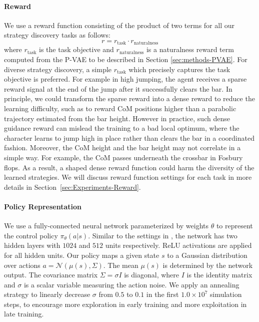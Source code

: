 \paragraph{Reward}
We use a reward function consisting of the product of two terms for all our strategy discovery tasks as follows:
\begin{equation}
\label{eq:stage1-reward}
    r = r_{\text{task}} \cdot r_{\text{naturalness}} 
\end{equation}    
where $r_{\text{task}}$ is the task objective and $r_{\text{naturalness}}$ is a naturalness reward term computed from the P-VAE to be described in Section \ref{sec:methods-PVAE}. For diverse strategy discovery, a simple $r_{\text{task}}$ which precisely captures the task objective is preferred. For example in high jumping, the agent receives a sparse reward signal at the end of the jump after it successfully clears the bar. In principle, we could transform the sparse reward into a dense reward to reduce the learning difficulty, such as to reward CoM positions higher than a parabolic trajectory estimated from the bar height. However in practice, such dense guidance reward can mislead the training to a bad local optimum, where the character learns to jump high in place rather than clears the bar in a coordinated fashion. Moreover, the CoM height and the bar height may not correlate in a simple way. For example, the CoM passes underneath the crossbar in Fosbury flops. As a result, a shaped dense reward function could harm the diversity of the learned strategies. We will discuss reward function settings for each task in more details in Section~\ref{sec:Experiments-Reward}.

\paragraph{Policy Representation}
We use a fully-connected neural network parameterized by weights $\theta$ to represent the control policy $\pi_\theta(a|s)$. Similar to the settings in \cite{Peng:2018:DeepMimic}, the network has two hidden layers with $1024$ and $512$ units respectively. ReLU activations are applied for all hidden units. Our policy maps a given state $s$ to a Gaussian distribution over actions $a=\mathcal{N}(\mu(s), \Sigma)$. The mean $\mu(s)$ is determined by the network output. The covariance matrix $\Sigma=\sigma I$ is diagonal, where $I$ is the identity matrix and $\sigma$ is a scalar variable measuring the action noise. We apply an annealing strategy to linearly decrease $\sigma$ from $0.5$ to $0.1$ in the first $1.0\times 10^7$ simulation steps, to encourage more exploration in early training and more exploitation in late training.

